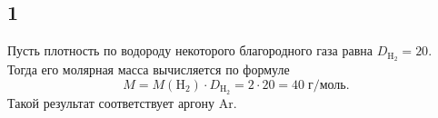 \subsection{1}
Пусть плотность по водороду некоторого благородного газа равна $D_\mathrm{H_2}=20$. Тогда его молярная масса вычисляется по формуле
\[
M=M(\mathrm{H_2})\cdot D_\mathrm{H_2}=2\cdot20=40\;\text{г/моль}.
\]
Такой результат соответствует аргону $\mathrm{Ar}$.